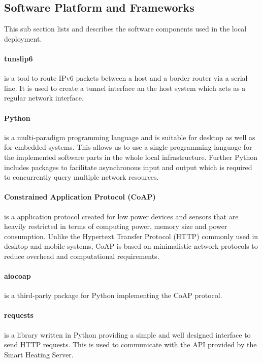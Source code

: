 \subsection{Software Platform and Frameworks}

This sub section lists and describes the software components used in the local deployment.

\paragraph{tunslip6} is a tool to route IPv6 packets between a host and a border router via a serial line.
It is used to create a tunnel interface an the host system which acts as a regular network interface.

\paragraph{Python} is a multi-paradigm programming language and is suitable for desktop as well as for embedded systems.
This allows us to use a single programming language for the implemented software parts in the whole local infrastructure.
Further Python includes packages to facilitate asynchronous input and output which is required to concurrently query multiple network resources.

\paragraph{Constrained Application Protocol (CoAP)} \cite{rfc7252} is a application protocol created for low power devices and sensors that are heavily restricted in terms of computing power, memory size and power consumption.
Unlike the Hypertext Transfer Protocol (HTTP) commonly used in desktop and mobile systems, CoAP is based on minimalistic network protocols to reduce overhead and computational requirements.

\paragraph{aiocoap} is a third-party package for Python implementing the CoAP protocol.

\paragraph{requests} is a library written in Python providing a simple and well designed interface to send HTTP requests.
This is used to communicate with the API provided by the Smart Heating Server.

